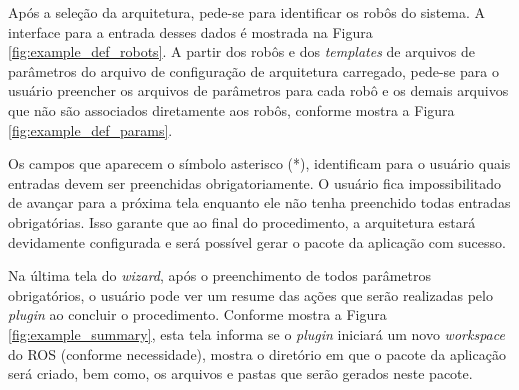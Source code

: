             Após a seleção da arquitetura, pede-se para identificar os robôs do sistema. A interface para a entrada desses dados é mostrada na Figura \ref{fig:example_def_robots}. A partir dos robôs e dos \textit{templates} de arquivos de parâmetros do arquivo de configuração de arquitetura carregado, pede-se para o usuário preencher os arquivos de parâmetros para cada robô e os demais arquivos que não são associados diretamente aos robôs, conforme mostra a Figura \ref{fig:example_def_params}.
            
            Os campos que aparecem o símbolo asterisco (*), identificam para o usuário quais entradas devem ser preenchidas obrigatoriamente. O usuário fica impossibilitado de avançar para a próxima tela enquanto ele não tenha preenchido todas entradas obrigatórias. Isso garante que ao final do procedimento, a arquitetura estará devidamente configurada e será possível gerar o pacote da aplicação com sucesso.
            
            Na última tela do \textit{wizard}, após o preenchimento de todos parâmetros obrigatórios, o usuário pode ver um resume das ações que serão realizadas pelo \textit{plugin} ao concluir o procedimento. Conforme mostra a Figura \ref{fig:example_summary}, esta tela informa se o \textit{plugin} iniciará um novo \textit{workspace} do ROS (conforme necessidade), mostra o diretório em que o pacote da aplicação será criado, bem como, os arquivos e pastas que serão gerados neste pacote.
            

